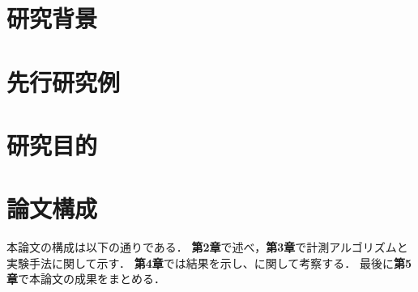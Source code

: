 \section{研究背景}

\section{先行研究例}

\section{研究目的}

\section{論文構成}
本論文の構成は以下の通りである．
{\bf 第2章}で述べ，{\bf 第3章}で計測アルゴリズムと実験手法に関して示す．
{\bf 第4章}では結果を示し、に関して考察する．
最後に{\bf 第5章}で本論文の成果をまとめる．
